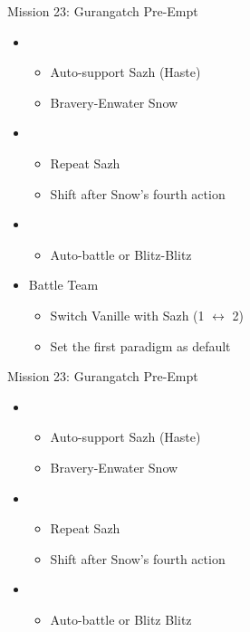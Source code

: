 \begin{paracol}{2}
	\begin{battle}{Mission 23: Gurangatch Pre-Empt}
		\begin{itemize}
			\item \first
			      \begin{itemize}
				      \item Auto-support Sazh (Haste)
				      \item Bravery-Enwater Snow
			      \end{itemize}
			\item \fifth
			      \begin{itemize}
				      \item Repeat Sazh
				      \item Shift after Snow's fourth action
			      \end{itemize}
			\item \sixth
			      \begin{itemize}
				      \item Auto-battle or Blitz-Blitz
			      \end{itemize}
		\end{itemize}
	\end{battle}
	\switchcolumn
	\begin{menu}
		\begin{itemize}
			\paradigm
			\begin{itemize}
				\item Battle Team
				      \begin{itemize}
					      \item Switch Vanille with Sazh (1 $\leftrightarrow$ 2)
					      \item Set the first paradigm as default
				      \end{itemize}
			\end{itemize}
		\end{itemize}
	\end{menu}
	\begin{battle}{Mission 23: Gurangatch Pre-Empt}
		\begin{itemize}
			\item \first
			      \begin{itemize}
				      \item Auto-support Sazh (Haste)
				      \item Bravery-Enwater Snow
			      \end{itemize}
			\item \fifth
			      \begin{itemize}
				      \item Repeat Sazh
				      \item Shift after Snow's fourth action
			      \end{itemize}
			\item \sixth
			      \begin{itemize}
				      \item Auto-battle or Blitz Blitz
			      \end{itemize}
		\end{itemize}
	\end{battle}
	\switchcolumn*


\end{paracol}
